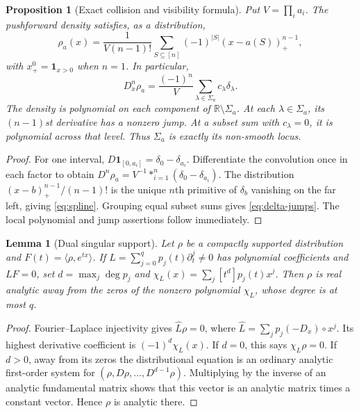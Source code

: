 \documentclass[11pt]{article}
\newtheorem{lemma}[theorem]{Lemma}
\newtheorem{proposition}[theorem]{Proposition}
\theoremstyle{definition}
\theoremstyle{remark}
\newcommand{\R}{\mathbb R}
\numberwithin{equation}{section}
\begin{document}
\begin{proposition}[Exact collision and visibility formula]
\label{prop:spline}
Put $V=\prod_i a_i$. The pushforward density satisfies, as a distribution,
\begin{equation}\label{eq:spline}
 \rho_a(x)=\frac{1}{V(n-1)!}
   \sum_{S\subseteq[n]}(-1)^{|S|}(x-a(S))_+^{n-1},
\end{equation}
with $x_+^0=\mathbf1_{x>0}$ when $n=1$. In particular,
\begin{equation}\label{eq:delta-jumps}
 D_x^n\rho_a=\frac{(-1)^n}{V}
          \sum_{\lambda\in\Sigma_a}c_\lambda\delta_\lambda.
\end{equation}
The density is polynomial on each component of $\R\setminus\Sigma_a$.
At each $\lambda\in\Sigma_a$, its $(n-1)$st derivative has a nonzero
jump. At a subset sum with $c_\lambda=0$, it is polynomial across that
level. Thus $\Sigma_a$ is exactly its non-smooth locus.
\end{proposition}
\begin{proof}
For one interval, $D\mathbf1_{[0,a_i]}=\delta_0-\delta_{a_i}$.
Differentiate the convolution once in each factor to obtain
$D^n\rho_a=V^{-1}\mathop{*}_{i=1}^n(\delta_0-\delta_{a_i})$.
The distribution $(x-b)_+^{n-1}/(n-1)!$ is the unique $n$th primitive
of $\delta_b$ vanishing on the far left, giving \eqref{eq:spline}.
Grouping equal subset sums gives \eqref{eq:delta-jumps}. The local
polynomial and jump assertions follow immediately.
\end{proof}

\begin{lemma}[Dual singular support]\label{lem:dual-local}
Let $\rho$ be a compactly supported distribution and
$F(t)=\langle\rho,e^{tx}\rangle$. If
$L=\sum_{j=0}^q p_j(t)\partial_t^j\ne0$ has polynomial coefficients
and $LF=0$, set $d=\max_j\deg p_j$ and
$\chi_L(x)=\sum_j[t^d]p_j(t)x^j$. Then $\rho$ is real analytic
away from the zeros of the nonzero polynomial $\chi_L$, whose degree
is at most $q$.
\end{lemma}
\begin{proof}
Fourier--Laplace injectivity gives
$\widehat L\rho=0$, where
$\widehat L=\sum_j p_j(-D_x)\circ x^j$.
Its highest derivative coefficient is $(-1)^d\chi_L(x)$.
If $d=0$, this says $\chi_L\rho=0$. If $d>0$, away from its zeros
the distributional equation is an ordinary analytic first-order system
for $(\rho,D\rho,\ldots,D^{d-1}\rho)$. Multiplying by the inverse of
an analytic fundamental matrix shows that this vector is an analytic
matrix times a constant vector. Hence $\rho$ is analytic there.
\end{proof}
\end{document}

